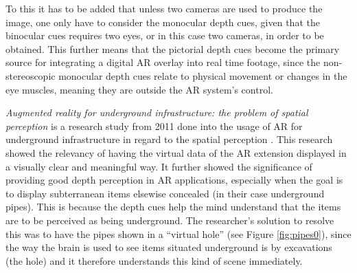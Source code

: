 To this it has to be added that unless two cameras are used to produce the image, one only have to consider the monocular depth cues, given that the binocular cues requires two eyes, or in this case two cameras, in order to be obtained. This further means that the pictorial depth cues become the primary source for integrating a digital AR overlay into real time footage, since the non-stereoscopic monocular depth cues relate to physical movement or changes in the eye muscles, meaning they are outside the AR system’s control.

\textit{Augmented reality for underground infrastructure: the problem of spatial perception} is a research study from 2011 done into the usage of AR for underground infrastructure in regard to the spatial perception \cite{Cote2011}. This research showed the relevancy of having the virtual data of the AR extension displayed in a visually clear and meaningful way. It further showed the significance of providing good depth perception in AR applications, especially when the goal is to display subterranean items elsewise concealed (in their case underground pipes). This is because the depth cues help the mind understand that the items are to be perceived as being underground. The researcher's solution to resolve this was to have the pipes shown in a “virtual hole” (see Figure \ref{fig:pipes0}), since the way the brain is used to see items situated underground is by excavations (the hole) and it therefore understands this kind of scene immediately.

